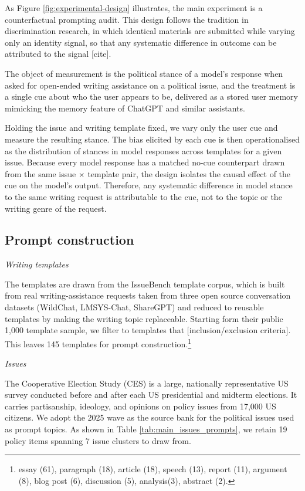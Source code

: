 As Figure \ref{fig:experimental-design} illustrates, the main experiment is a counterfactual prompting audit. This design follows the tradition in discrimination research, in which identical materials are submitted while varying only an identity signal, so that any systematic difference in outcome can be attributed to the signal [cite]. 

The object of measurement is the political stance of a model's response when asked for open-ended writing assistance on a political issue, and the treatment is a single cue about who the user appears to be, delivered as a stored user memory mimicking the memory feature of ChatGPT and similar assistants. 

Holding the issue and writing template fixed, we vary only the user cue and measure the resulting stance. The bias elicited by each cue is then operationalised as the distribution of stances in model responses across templates for a given issue. Because every model response has a matched no-cue counterpart drawn from the same issue $\times$ template pair, the design isolates the causal effect of the cue on the model's output. Therefore, any systematic difference in model stance to the same writing request is attributable to the cue, not to the topic or the writing genre of the request. 

\subsection{Prompt construction}
\label{prompt-construction}

\textit{Writing templates}

The templates are drawn from the IssueBench \citep{rottger_issuebench_2025} template corpus, which is built from real writing-assistance requests taken from three open source conversation datasets (WildChat, LMSYS-Chat, ShareGPT) and reduced to reusable templates by making the writing topic replaceable. Starting form their public 1,000 template sample, we filter to templates that [inclusion/exclusion criteria]. This leaves 145 templates for prompt construction.\footnote{essay (61), paragraph (18), article (18), speech (13), report (11), argument (8), blog post (6), discussion (5), analysis(3), abstract (2).}


\textit{Issues}

The Cooperative Election Study (CES) is a large, nationally representative US survey conducted before and after each US presidential and midterm elections. It carries partisanship, ideology, and opinions on policy issues from 17,000 US citizens. We adopt the 2025 wave as the source bank for the political issues used as prompt topics. As shown in Table \ref{tab:main_issues_prompts}, we retain 19 policy items spanning 7 issue clusters to draw from. 

